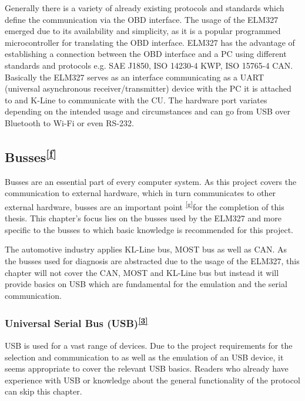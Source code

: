 {Generally there is a variety of already existing protocols and
standards which define the communication via the OBD interface. The
usage of the ELM327 emerged due to its availability and simplicity, as
it is a popular programmed microcontroller for translating the OBD
interface. ELM327 has the advantage of establishing a connection between
the OBD interface and a PC using different standards and protocols e.g.
SAE J1850, ISO 14230-4 KWP, ISO 15765-4 CAN. Basically the ELM327 serves
as an interface communicating as a UART (}{universal asynchronous
receiver/transmitter) device with the PC it is attached to and K-Line to
communicate with the CU. The hardware port variates depending on the
intended usage and circumstances and can go from USB over Bluetooth to
Wi-Fi or even RS-232. }

\hypertarget{h.a007s3g11xnb}{\subsection{\texorpdfstring{{Busses}\textsuperscript{\protect\hyperlink{cmnt6}{{[}f{]}}}}{Busses{[}f{]}}}\label{h.a007s3g11xnb}}

{Busses are an essential part of every computer system. As this project
covers the communication to external hardware, which in turn
communicates to }{other external hardware, busses are an important
}{point }\textsuperscript{\protect\hyperlink{cmnt7}{{[}g{]}}}{for the
completion of this thesis. This chapter's focus lies on the busses used
by the ELM327 and more specific to the busses to which basic knowledge
is recommended for this project. ~}

{The automotive industry applies KL-Line bus, MOST bus as well as CAN.
As the busses used for diagnosis are abstracted due to the usage of the
ELM327, this chapter will not cover the CAN, MOST and KL-Line bus but
instead it will provide basics on USB which are fundamental for the
emulation and the serial communication.}

\hypertarget{h.g52kpz9o7mut}{\subsubsection{\texorpdfstring{{Universal
Serial Bus
(USB)}\textsuperscript{\protect\hyperlink{ftnt3}{{[}3{]}}}}{Universal Serial Bus (USB){[}3{]}}}\label{h.g52kpz9o7mut}}

{USB is used for a vast range of devices. Due to the project
requirements for the selection and communication to as well as the
emulation of an USB device, it seems appropriate to cover the relevant
USB basics. Readers who already have experience with USB or knowledge
about the general functionality of the protocol can skip this chapter.}

